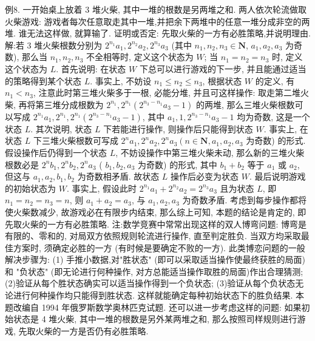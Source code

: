例8. 一开始桌上放着 3 堆火柴, 其中一堆的根数是另两堆之和.
两人依次轮流做取火柴游戏: 游戏者每次任意取走其中一堆,并把余下两堆中的任意一堆分成非空的两堆.
谁无法这样做, 就算输了.
证明或否定: 先取火柴的一方有必胜策略,并说明理由.
解:若 3 堆火柴根数分别为 $2^{n_1} a_1, 2^{n_2} a_2, 2^{n_3} a_3$ (其中 $n_1, n_2, n_3 \in \mathbf{N}$, $a_1, a_2, a_3$ 为奇数), 那么当 $n_1, n_2, n_3$ 不全相等时, 定义这个状态为 $W$; 当 $n_1=n_2=n_3$ 时, 定义这个状态为 $L$.
首先说明: 在状态 $W$ 下总可以进行游戏的下一步, 并且能通过适当的策略得到某个状态 $L$. 事实上, 不妨设 $n_1 \leqslant n_2 \leqslant n_3$, 根据状态 $W$ 的定义, 有 $n_1< n_3$, 注意此时第三堆火柴多于一根, 必能分堆, 并且可这样操作: 取走第二堆火柴, 再将第三堆分成根数为 $2^{n_1}, 2^{n_1}\left(2^{n_3-n_1} a_3-1\right)$ 的两堆, 那么三堆火柴根数可以写成 $2^{n_1} a_1, 2^{n_1}, 2^{n_1}\left(2^{n_3-n_1} a_3-1\right)$, 其中 $a_1, 1,2^{n_3-n_1} a_3-1$ 均为奇数, 这是一个状态 $L$.
其次说明, 状态 $L$ 下若能进行操作, 则操作后只能得到状态 $W$. 事实上, 在状态 $L$ 下三堆火柴根数可写成 $2^n a_1, 2^n a_2, 2^n a_3\left(n \in \mathbf{N}, a_1, a_2, a_3\right.$ 为奇数) 的形式.
假设操作后仍得到一个状态 $L$, 不妨设操作中第三堆火柴未动, 那么新的三堆火柴根数必是 $2^n b_1, 2^n b_2, 2^n a_3$ ( $b_1, b_2, a_3$ 为奇数) 的形式, 其中 $b_1+b_2$ 等于 $a_1$ 或 $a_2$, 但这与 $a_1, a_2, b_1, b_2$ 为奇数相矛盾.
故状态 $L$ 操作后必变为状态 $W$.
最后说明游戏的初始状态为 $W$. 事实上, 假设此时 $2^{n_1} a_1+2^{n_2} a_2=2^{n_3} a_3$ 且为状态 $L$, 即 $n_1=n_2=n_3=n$, 则 $a_1+a_2=a_3$, 与 $a_1, a_2, a_3$ 为奇数矛盾.
考虑到每步操作都将使火柴数减少, 故游戏必在有限步内结束, 那么综上可知, 本题的结论是肯定的, 即先取火柴的一方有必胜策略.
注:数学竞赛中常常出现这样的双人博弯问题: 博弯是有限的、零和的, 对局双方依照规则轮流进行操作, 直至判定胜负.
当双方均采取最佳方案时, 须确定必胜的一方 (有时候是要确定不败的一方). 此类博恋问题的一般解决步骤为:
(1) 手推小数据,对"胜状态" (即可以采取适当操作使最终获胜的局面)和 "负状态" (即无论进行何种操作, 对方总能适当操作取胜的局面)作出合理猜测;
(2)验证从每个胜状态确实可以适当操作得到一个负状态;
(3)验证从每个负状态无论进行何种操作均只能得到胜状态.
这样就能确定每种初始状态下的胜负结果.
本题改编自 1994 年俄罗斯数学奥林匹克试题.
还可以进一步考虑这样的问题: 如果初始状态是 4 堆火柴, 其中一堆的根数是另外某两堆之和, 那么按照司样规则进行游戏, 先取火柴的一方是否仍有必胜策略.


